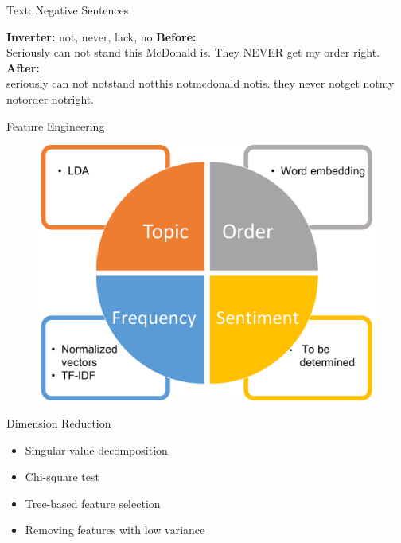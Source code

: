 \documentclass[10pt]{beamer}
\begin{document}


\begin{frame}{Text: Negative Sentences}

\textbf{Inverter: } not, never, lack, no
\newline
\newline
\textbf{Before:}\\
Seriously can not stand this McDonald is. They NEVER get my order right.
\newline
\newline
\textbf{After:}\\
seriously can not notstand notthis notmcdonald notis. they never notget notmy notorder notright.\\

\end{frame}

\begin{frame}{Feature Engineering}
   \begin{figure}
    \centering
    \includegraphics[scale=0.35]{feateng.pdf}
    
\end{figure}     
\end{frame}
\begin{frame}{Dimension Reduction}
\begin{itemize}
	\item Singular value decomposition
	\item Chi-square test
	\item Tree-based feature selection
	\item Removing features with low variance
\end{itemize}
\end{frame}
\end{document}

